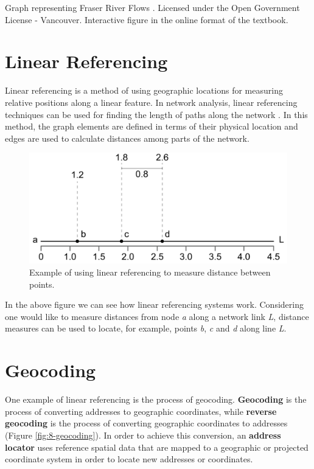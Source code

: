 \documentclass[
]{book}
\begin{document}
\label{fig:8-fraser-river-flows}Graph representing Fraser River Flows \citep{city_of_vancouver_open_nodate}. Licensed under the Open Government License - Vancouver. Interactive figure in the online format of the textbook.

\section{Linear Referencing}\label{linear-referencing}

Linear referencing is a method of using geographic locations for measuring relative positions along a linear feature. In network analysis, linear referencing techniques can be used for finding the length of paths along the network \citep{ramsey_23_2012}. In this method, the graph elements are defined in terms of their physical location and edges are used to calculate distances among parts of the network.

\begin{figure}
\includegraphics[width=0.8\linewidth]{images/08-linear_referencing} \caption{Example of using linear referencing to measure distance between points.}\label{fig:8-lienar-referencing}
\end{figure}

In the above figure we can see how linear referencing systems work. Considering one would like to measure distances from node \emph{a} along a network link \emph{L}, distance measures can be used to locate, for example, points \emph{b}, \emph{c} and \emph{d} along line \emph{L}.

\section{Geocoding}\label{geocoding}

One example of linear referencing is the process of geocoding. \textbf{Geocoding} is the process of converting addresses to geographic coordinates, while \textbf{reverse geocoding} is the process of converting geographic coordinates to addresses (Figure \ref{fig:8-geocoding}). In order to achieve this conversion, an \textbf{address locator} uses reference spatial data that are mapped to a geographic or projected coordinate system in order to locate new addresses or coordinates.
\end{document}
